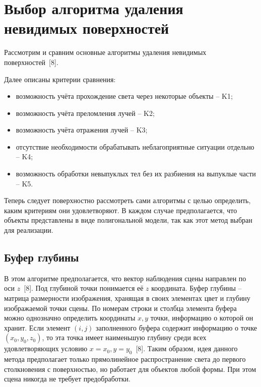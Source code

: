\section{Выбор алгоритма удаления невидимых поверхностей} {
    Рассмотрим и сравним основные алгоритмы удаления невидимых поверхностей~[8].

    Далее описаны критерии сравнения:
    \begin{itemize}
        \item возможность учёта прохождение света через некоторые объекты -- K1;
        \item возможность учёта преломления лучей -- K2;
        \item возможность учёта отражения лучей -- K3;
        \item отсутствие необходимости обрабатывать неблагоприятные
        ситуации отдельно -- K4;
        \item возможность обработки невыпуклых тел без их разбиения
        на выпуклые части -- K5.
    \end{itemize}

    Теперь следует поверхностно рассмотреть сами алгоритмы с целью определить,
    каким критериям они удовлетворяют.
    В каждом случае предполагается, что объекты представлены в виде полигональной
    модели, так как этот метод выбран для реализации.

    \subsection{Буфер глубины} {
        В этом алгоритме предполагается, что вектор наблюдения сцены
        направлен по оси $z$~[8].
        Под глубиной точки понимается её $z$ координата.
        Буфер глубины -- матрица размерности изображения, хранящая
        в своих элементах цвет и глубину изображаемой точки сцены.
        По номерам строки и столбца элемента буфера можно однозначно определить
        координаты $x, y$ точки, информацию о которой он хранит.
        Если элемент $(i, j)$ заполненного буфера содержит информацию
        о точке $(x_0, y_0, z_0)$, то эта точка имеет наименьшую глубину
        среди всех удовлетворяющих условию $x = x_0, y = y_0$~[8].
        Таким образом, идея данного метода предполагает только прямолинейное
        распространение света до первого столкновения с поверхностью,
        но работает для объектов любой формы.
        При этом сцена никогда не требует предобработки.
    }

}
